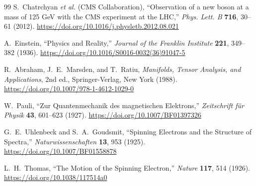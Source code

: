 \documentclass[%
 reprint,
 amsmath,amssymb,
 aps,
]{revtex4-1}
\numberwithin{equation}{section}%
\begin{document}
\begin{thebibliography}{99}
S.~Chatrchyan \textit{et al.} (CMS Collaboration), 
``Observation of a new boson at a mass of 125 GeV with the CMS experiment at the LHC,'' 
\textit{Phys. Lett. B} \textbf{716}, 30--61 (2012).
\href{https://doi.org/10.1016/j.physletb.2012.08.021}{https://doi.org/10.1016/j.physletb.2012.08.021}

A.~Einstein, 
``Physics and Reality,'' 
\textit{Journal of the Franklin Institute} \textbf{221}, 349--382 (1936).
\href{https://doi.org/10.1016/S0016-0032(36)91047-5}{https://doi.org/10.1016/S0016-0032(36)91047-5}

R.~Abraham, J.~E.~Marsden, and T.~Ratiu, 
\textit{Manifolds, Tensor Analysis, and Applications}, 
2nd ed., Springer-Verlag, New York (1988).
\href{https://doi.org/10.1007/978-1-4612-1029-0}{https://doi.org/10.1007/978-1-4612-1029-0}

W.~Pauli, 
``Zur Quantenmechanik des magnetischen Elektrons,'' 
\textit{Zeitschrift für Physik} \textbf{43}, 601--623 (1927).
\href{https://doi.org/10.1007/BF01397326}{https://doi.org/10.1007/BF01397326}

G.~E.~Uhlenbeck and S.~A.~Goudsmit, 
``Spinning Electrons and the Structure of Spectra,'' 
\textit{Naturwissenschaften} \textbf{13}, 953 (1925).
\href{https://doi.org/10.1007/BF01558878}{https://doi.org/10.1007/BF01558878}

L.~H.~Thomas, 
``The Motion of the Spinning Electron,'' 
\textit{Nature} \textbf{117}, 514 (1926).
\href{https://doi.org/10.1038/117514a0}{https://doi.org/10.1038/117514a0}


\end{thebibliography}
\end{document}
